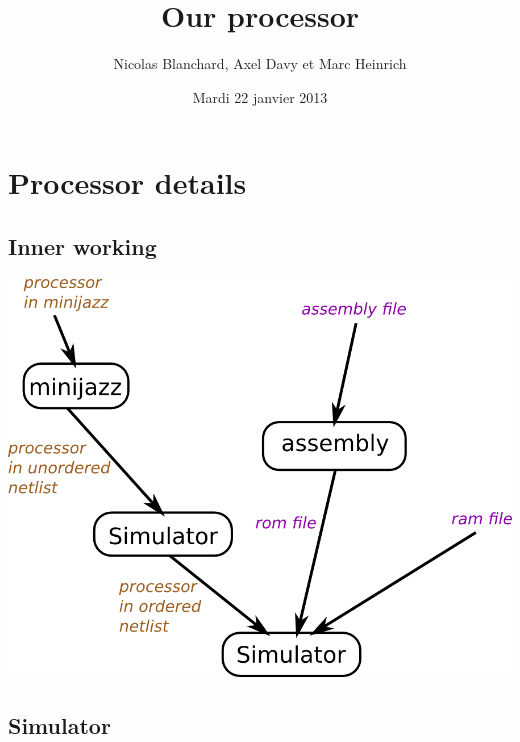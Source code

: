 \documentclass[c]{beamer}
\title{Our processor}
\author{Nicolas Blanchard, Axel Davy et Marc Heinrich}
\institute{Ecole Normale Supérieure}
\date{Mardi 22 janvier 2013}
\begin{document}
\begin{frame}
  \titlepage
\end{frame}

\begin{frame}
  \tableofcontents
\end{frame}

\section{Processor details}

\subsection{Inner working}
\begin{frame}
  \includegraphics[scale=0.4]{schema_fonctionnement.png}
\end{frame}

\subsection{Simulator}
\end{document}
